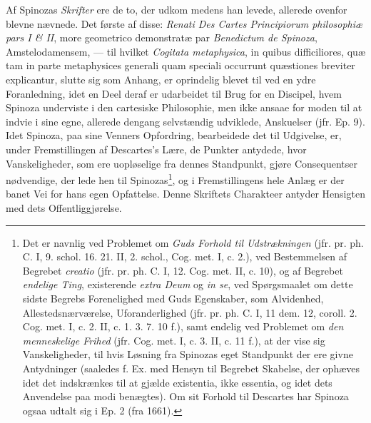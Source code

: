\documentclass[12pt,a4paper]{book}
\newcommand{\opage}[1]{\marginnote{\footnotesize\textit{[#1]}}}
\begin{document}
Af Spinozas \emph{Skrifter} ere de to, der udkom medens han levede,
allerede ovenfor blevne nævnede. Det første af disse: \emph{Renati Des
Cartes Principiorum philosophiæ pars I \& II}, more geometrico
demonstratæ par \emph{Benedictum de Spinoza}, Amstelodamensem, --- til
hvilket \emph{Cogitata metaphysica}, in quibus difficiliores, quæ tam in
parte metaphysices generali quam speciali occurrunt quæstiones breviter
explicantur, slutte sig som Anhang, er oprindelig blevet til ved en ydre
Foranledning, idet en Deel deraf er udarbeidet til Brug for en Discipel,
hvem Spinoza underviste i den cartesiske Philosophie, men ikke ansaae for
moden til at indvie i sine egne, allerede dengang selvstændig udviklede,
Anskuelser (jfr. Ep. 9). Idet Spinoza, paa sine Venners Opfordring,
bearbeidede det til Udgivelse, er, under Fremstillingen af Descartes's
Lære, de Punkter antydede, hvor Vanskeligheder, som ere uopløselige fra
dennes Standpunkt, gjøre Consequentser nødvendige, der lede hen til
Spinozas\footnote{Det er navnlig ved Problemet om \emph{Guds Forhold til
Udstrækningen} (jfr. pr. ph. C. I, 9. schol. 16. 21. II, 2. schol., Cog.
met. I, c. 2.), ved Bestemmelsen af Begrebet \emph{creatio} (jfr. pr. ph.
C. I, 12. Cog. met. II, c. 10), og af Begrebet \emph{endelige Ting},
existerende \emph{extra Deum} og \emph{in se}, ved Spørgsmaalet om dette
sidste Begrebs Forenelighed med Guds Egenskaber, som Alvidenhed,
Allestedsnærværelse, Uforanderlighed (jfr. pr. ph. C. I, 11 dem. 12,
coroll. 2. Cog. met. I, c. 2. II, c. 1. 3. 7. 10 f.), samt endelig ved
Problemet om \emph{den menneskelige Frihed} (jfr. Cog. met. I, c. 3. II,
c. 11 f.), at der vise sig Vanskeligheder, til hvis Løsning fra Spinozas
eget Standpunkt der ere givne Antydninger (saaledes f. Ex. med Hensyn til
Begrebet Skabelse, der ophæves idet det indskrænkes til at gjælde
existentia, ikke essentia, og idet dets Anvendelse paa modi benægtes). Om
sit Forhold til Descartes har Spinoza ogsaa udtalt sig i Ep. 2 (fra
1661).},
og i Fremstillingens hele Anlæg er der banet
\opage{35} \setcounter{footnote}{0}%
Vei for hans egen Opfattelse. Denne Skriftets Charakteer antyder Hensigten
med dets Offentliggjørelse.
\end{document}
